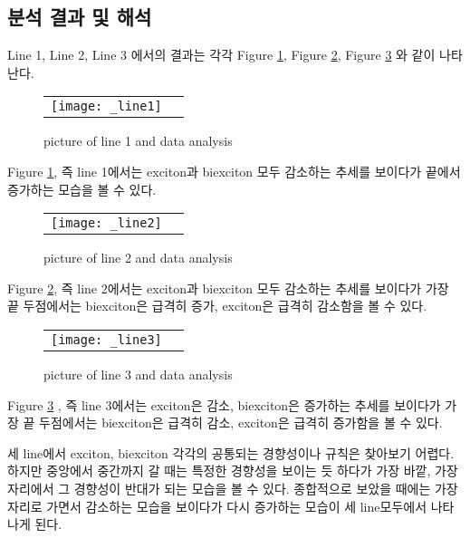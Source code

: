 \subsection{분석 결과 및 해석}
Line 1, Line 2, Line 3 에서의 결과는 각각 Figure \ref{fig:line1}, Figure \ref{fig:line2}, Figure \ref{fig:line3} 와 같이 나타난다.
\begin{figure}[H]
	\begin{center}
		\begin{tabular}{cc}
			\texttt{[image: \_line1]}
		\end{tabular}
	\end{center}
	\caption{picture of line 1 and data analysis}
	\label{fig:line1}  
\end{figure}
Figure \ref{fig:line1}, 즉 line 1에서는 exciton과 biexciton 모두 감소하는 추세를 보이다가 끝에서 증가하는 모습을 볼 수 있다.
\begin{figure}[H]
	\begin{center}
		\begin{tabular}{cc}
			\texttt{[image: \_line2]}
		\end{tabular}
	\end{center}
	\caption{picture of line 2 and data analysis}
	\label{fig:line2}  
\end{figure}
Figure \ref{fig:line2}, 즉 line 2에서는 exciton과 biexciton 모두 감소하는 추세를 보이다가 가장 끝 두점에서는 biexciton은 급격히 증가, exciton은 급격히 감소함을 볼 수 있다.

\begin{figure}[H]
	\begin{center}
		\begin{tabular}{cc}
			\texttt{[image: \_line3]}
		\end{tabular}
	\end{center}
	\caption{picture of line 3 and data analysis}
	\label{fig:line3}  
\end{figure}
Figure \ref{fig:line3} , 즉 line 3에서는 exciton은 감소, biexciton은 증가하는 추세를 보이다가 가장 끝 두점에서는 biexciton은 급격히 감소, exciton은 급격히 증가함을 볼 수 있다.

세 line에서 exciton, biexciton 각각의 공통되는 경향성이나 규칙은 찾아보기 어렵다. 하지만 중앙에서 중간까지 갈 때는 특정한 경향성을 보이는 듯 하다가 가장 바깥, 가장자리에서 그 경향성이 반대가 되는 모습을 볼 수 있다. 종합적으로 보았을 때에는 가장자리로 가면서 감소하는 모습을 보이다가 다시 증가하는 모습이 세 line모두에서 나타나게 된다.
